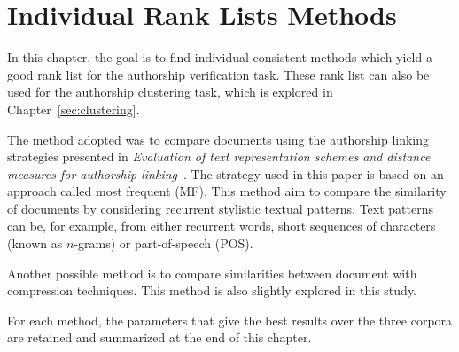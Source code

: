 \chapter{Individual Rank Lists Methods \label{sec:individual_methods}}

In this chapter, the goal is to find individual consistent methods which yield a good rank list for the authorship verification task.
These rank list can also be used for the authorship clustering task, which is explored in Chapter~\ref{sec:clustering}.

The method adopted was to compare documents using the authorship linking strategies presented in \textit{Evaluation of text representation schemes and distance measures for authorship linking}~\cite{kocher_verification}.
The strategy used in this paper is based on an approach called most frequent (MF).
This method aim to compare the similarity of documents by considering recurrent stylistic textual patterns.
Text patterns can be, for example, from either recurrent words, short sequences of characters (known as $n$-grams) or part-of-speech (POS).

Another possible method is to compare similarities between document with compression techniques.
This method is also slightly explored in this study.

For each method, the parameters that give the best results over the three corpora are retained and summarized at the end of this chapter.







